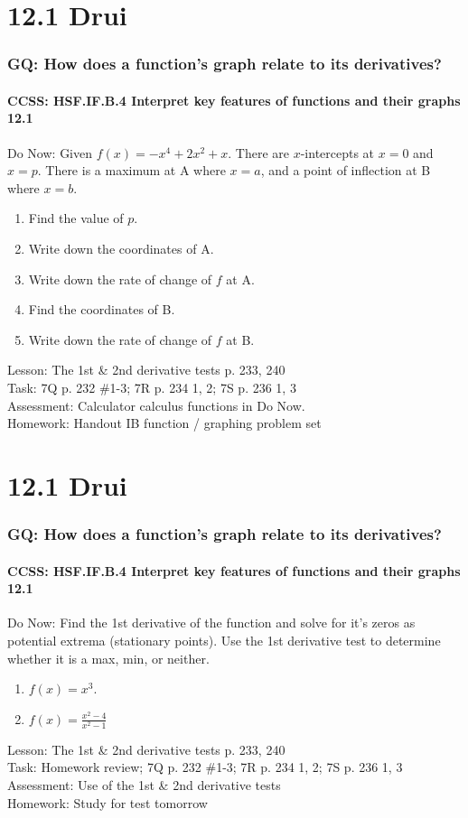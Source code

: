 \documentclass{beamer}
\begin{document}
  \section{12.1 Drui}
  \frame
  {
    \frametitle{GQ: How does a function's graph relate to its derivatives?}
    \framesubtitle{CCSS: HSF.IF.B.4 Interpret key features of functions and their graphs \qquad \alert{12.1}}

    \begin{block}{Do Now: Given $f\left(x\right) =-x^4 +2x^2 +x$. There are $x$-intercepts at $x=0$ and $x=p$. There is a maximum at A where $x=a$, and a point of inflection at B where $x=b$.}
    \begin{enumerate}
        \item Find the value of $p$.
        \item Write down the coordinates of A.
        \item Write down the rate of change of $f$ at A.
        \item Find the coordinates of B.
        \item Write down the rate of change of $f$ at B.
    \end{enumerate}
    \end{block}
    Lesson: The 1st \& 2nd derivative tests p. 233, 240\\%
    Task: 7Q p. 232 \#1-3; 7R p. 234 1, 2; 7S p. 236 1, 3 \\%
    Assessment: Calculator calculus functions in Do Now.
    \\%
    Homework: Handout IB function / graphing problem set
  }

  \section{12.1 Drui}
  \frame
  {
    \frametitle{GQ: How does a function's graph relate to its derivatives?}
    \framesubtitle{CCSS: HSF.IF.B.4 Interpret key features of functions and their graphs \qquad \alert{12.1}}

    \begin{block}{Do Now: Find the 1st derivative of the function and solve for it's zeros as potential extrema (stationary points). Use the 1st derivative test to determine whether it is a max, min, or neither.}
    \begin{enumerate}
        \item $f(x)=x^3$.
        \item $\displaystyle f(x)=\frac{x^2-4}{x^2-1}$
    \end{enumerate}
    \end{block}
    Lesson: The 1st \& 2nd derivative tests p. 233, 240\\%
    Task: Homework review; 7Q p. 232 \#1-3; 7R p. 234 1, 2; 7S p. 236 1, 3 \\%
    Assessment: Use of the 1st \& 2nd derivative tests
    \\%
    Homework: Study for test \alert{tomorrow}
  }
\end{document}
